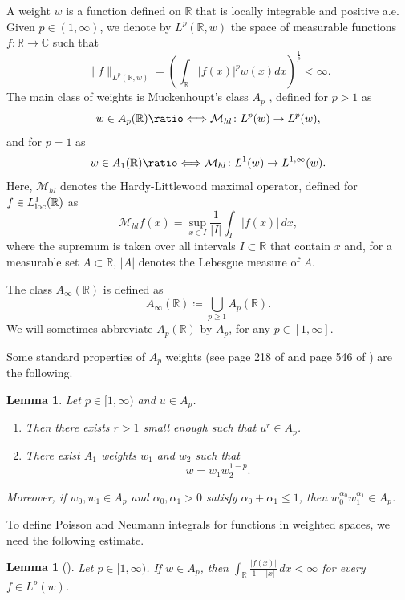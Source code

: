 \documentclass[12pt]{amsart}
\newcommand{\R}{\mathbb{R}}
\newcommand*{\longeq}{\ratio\Longleftrightarrow}
\theoremstyle{plain}
\newtheorem{lemma}[theorem]{Lemma}
\theoremstyle{definition}
\numberwithin{equation}{section}
\begin{document}
A weight $w$ is a function defined on $\mathbb{R}$ that is locally integrable and positive a.e. Given $p\in (1,\infty)$, we denote by $L^p(\mathbb{R}, w)$ the space of measurable functions $f: \mathbb{R} \rightarrow \mathbb{C}$ such that
\[
\|f\|_{L^p(\mathbb{R}, w)}
=
\left(\int_{\mathbb{R}}|f(x)|^p w(x) d x\right)^{\frac{1}{p}}
<
\infty.
\]
The main class of weights is Muckenhoupt's class $A_p$ \cite{M1972}, defined for $p>1$ as
\[
w\in A_p(\R)
\longeq
\mathcal{M}_{hl}\colon L^p(w)\to L^p(w),
\]
and for $p=1$ as
\[
w\in A_1(\R)
\longeq
\mathcal{M}_{hl}\colon L^1(w)\to L^{1,\infty}(w).
\]
Here, $\mathcal{M}_{hl}$ denotes the Hardy-Littlewood maximal operator, defined for $f\in L_{\rm{loc}}^{1}(\R)$ as
\[
\mathcal{M}_{h l} f(x)
=
\sup_{x\in I}\frac{1}{|I|}\int_I|f(x)|\, dx,
\]
where the supremum is taken over all intervals $I \subset \mathbb{R}$ that contain $x$ and, for a measurable set $A \subset \mathbb{R}$, $|A|$ denotes the Lebesgue measure of $A$.

The class $A_{\infty}(\R)$ is defined as
\[
A_{\infty}(\R)
\coloneqq
\bigcup_{p\geq 1}A_{p}(\R).
\]
We will sometimes abbreviate $A_{p}(\R)$ by $A_p$, for any $p\in [1,\infty]$. 


Some standard properties of $A_p$ weights (see page 218 of \cite{steinHarmonic} and page 546 of \cite{grafakosClassical}) are the following. 



\begin{lemma}\label{lemma:improvingA1}    Let $p\in [1,\infty)$ and $u\in A_p$. 
\begin{enumerate}
\item  Then there exists $r>1$ small enough such that $u^r\in A_p$.
\item There exist $A_1$ weights $w_1$ and $w_2$ such that
\[
w=w_1 w_2^{1-p} .
\]
\end{enumerate}


Moreover, if $w_0,w_1\in A_p$ and $\alpha_0,\alpha_1>0$ satisfy $\alpha_0+\alpha_1\leq 1$, then $w_0^{\alpha_0}w_1^{\alpha_1}\in A_p$.

\end{lemma}


To define Poisson and Neumann integrals for functions in weighted spaces, we need the following estimate. 

\begin{lemma}[\cite{CNO}]\label{lemma:estimateNeumannIntegral}
    Let $p\in [1,\infty)$. If $w\in A_p$, then $\int_{\R}\frac{|f(x)|}{1+|x|}\, dx<\infty$ for every $f\in L^p(w)$.
\end{lemma}
\end{document}
